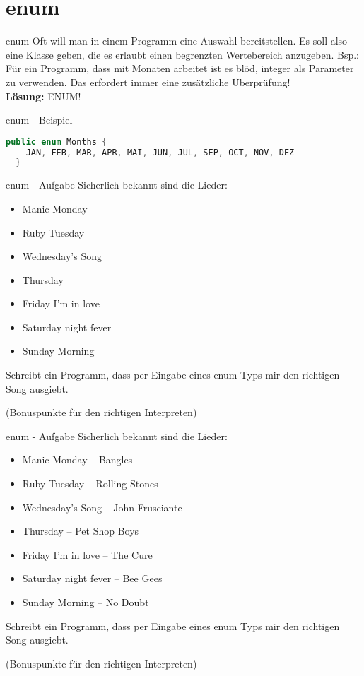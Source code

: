 \documentclass[18pt]{beamer}
\begin{document}
\section{enum}
\begin{frame}{enum}
 Oft will man in einem Programm eine Auswahl bereitstellen. Es soll also eine Klasse geben,
 die es erlaubt einen begrenzten Wertebereich anzugeben.
 Bsp.: Für ein Programm, dass mit Monaten arbeitet ist es blöd, integer als Parameter zu verwenden. Das erfordert immer eine
 zusätzliche Überprüfung! \\
 \pause
 \textbf{Lösung: } ENUM!
\end{frame}
\begin{frame}[fragile]{enum - Beispiel}
 \begin{lstlisting}[language=java]
  public enum Months {
    JAN, FEB, MAR, APR, MAI, JUN, JUL, SEP, OCT, NOV, DEZ
  }
 \end{lstlisting}
\end{frame}

\begin{frame}{enum - Aufgabe}
 Sicherlich bekannt sind die Lieder: 
 \begin{itemize}
  \item Manic Monday
  \item Ruby Tuesday
  \item Wednesday's Song
  \item Thursday
  \item Friday I'm in love
  \item Saturday night fever
  \item Sunday Morning
 \end{itemize}
 Schreibt ein Programm, dass per Eingabe eines enum Typs mir den richtigen Song ausgiebt. 
 
 (Bonuspunkte für den richtigen Interpreten)
\end{frame}

\begin{frame}{enum - Aufgabe}
 Sicherlich bekannt sind die Lieder: 
 \begin{itemize}
  \item Manic Monday – Bangles
  \item Ruby Tuesday – Rolling Stones
  \item Wednesday's Song – John Frusciante
  \item Thursday – Pet Shop Boys
  \item Friday I'm in love – The Cure
  \item Saturday night fever – Bee Gees
  \item Sunday Morning – No Doubt
 \end{itemize}
 Schreibt ein Programm, dass per Eingabe eines enum Typs mir den richtigen Song ausgiebt. 
 
 (Bonuspunkte für den richtigen Interpreten)
\end{frame}
\end{document}
